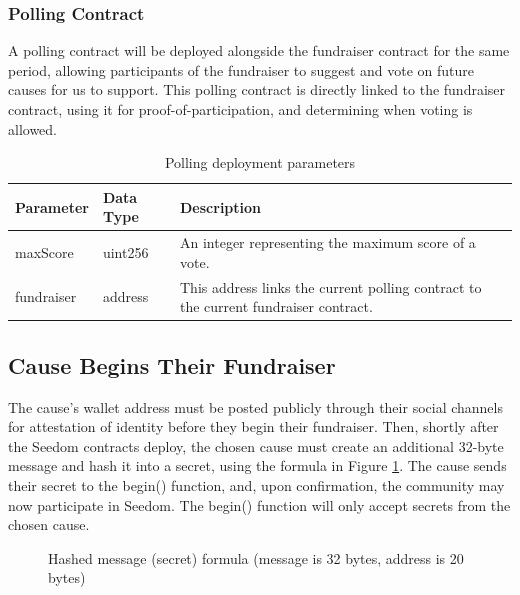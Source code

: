 \documentclass[11pt]{article}
\begin{document}
\subsubsection{Polling Contract}

A polling contract will be deployed alongside the fundraiser contract for the same period, allowing participants of the fundraiser to suggest and vote on future causes for us to support. This polling contract is directly linked to the fundraiser contract, using it for proof-of-participation, and determining when voting is allowed.

\begin{table}[H]
\begin{center}
\begin{tabular}{| l | l | p{32em} |}
\hline
\textbf{Parameter} & \textbf{Data Type} & \textbf{Description} \\ \hline
maxScore & uint256 & An integer representing the maximum score of a vote. \\ \hline
fundraiser & address & This address links the current polling contract to the current fundraiser contract. \\ \hline
\end{tabular}
\caption{Polling deployment parameters}
\label{tab:pollingDeploymentParameters}
\end{center}
\end{table}

\subsection{Cause Begins Their Fundraiser}

The cause's wallet address must be posted publicly through their social channels for attestation of identity before they begin their fundraiser. Then, shortly after the Seedom contracts deploy, the chosen cause must create an additional 32-byte message and hash it into a secret, using the formula in Figure \ref{figure:secretGenerationFormula}. The cause sends their secret to the begin() function, and, upon confirmation, the community may now participate in Seedom. The begin() function will only accept secrets from the chosen cause.

\begin{figure}[H]
\begin{center}
\caption{Hashed message (secret) formula (message is 32 bytes, address is 20 bytes)}
\label{figure:secretGenerationFormula}
\end{center}
\end{figure}
\end{document}
